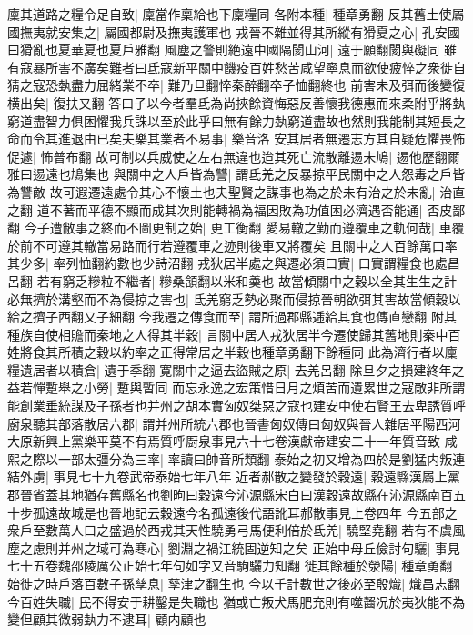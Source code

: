 廩其道路之糧令足自致|{
	廩當作稟給也下廩糧同}
各附本種|{
	種章勇翻}
反其舊土使屬國撫夷就安集之|{
	屬國都尉及撫夷護軍也}
戎晉不雜並得其所縱有猾夏之心|{
	孔安國曰猾亂也夏華夏也夏戶雅翻}
風塵之警則絶遠中國隔閡山河|{
	遠于願翻閡與礙同}
雖有寇暴所害不廣矣難者曰氐寇新平關中饑疫百姓愁苦咸望寧息而欲使疲悴之衆徙自猜之寇恐埶盡力屈緒業不卒|{
	難乃旦翻悴秦醉翻卒子恤翻終也}
前害未及弭而後變復横出矣|{
	復扶又翻}
答曰子以今者羣氐為尚挾餘資悔惡反善懷我德惠而來柔附乎將埶窮道盡智力俱困懼我兵誅以至於此乎曰無有餘力埶窮道盡故也然則我能制其短長之命而令其進退由已矣夫樂其業者不易事|{
	樂音洛}
安其居者無遷志方其自疑危懼畏怖促遽|{
	怖普布翻}
故可制以兵威使之左右無違也迨其死亡流散離逷未鳩|{
	逷他歷翻爾雅曰逷遠也鳩集也}
與關中之人戶皆為讐|{
	謂氐羌之反暴掠平民關中之人怨毒之戶皆為讐敵}
故可遐遷遠處令其心不懷土也夫聖賢之謀事也為之於未有治之於未亂|{
	治直之翻}
道不著而平德不顯而成其次則能轉禍為福因敗為功值困必濟遇否能通|{
	否皮鄙翻}
今子遭敝事之終而不圖更制之始|{
	更工衡翻}
愛易轍之勤而遵覆車之軌何哉|{
	車覆於前不可遵其轍當易路而行若遵覆車之迹則後車又將覆矣}
且關中之人百餘萬口率其少多|{
	率列恤翻約數也少詩沼翻}
戎狄居半處之與遷必須口實|{
	口實謂糧食也處昌呂翻}
若有窮乏糝粒不繼者|{
	糝桑頷翻以米和羮也}
故當傾關中之穀以全其生生之計必無擠於溝壑而不為侵掠之害也|{
	氐羌窮乏勢必聚而侵掠晉朝欲弭其害故當傾穀以給之擠子西翻又子細翻}
今我遷之傳食而至|{
	謂所過郡縣逓給其食也傳直戀翻}
附其種族自使相贍而秦地之人得其半穀|{
	言關中居人戎狄居半今遷使歸其舊地則秦中百姓將食其所積之穀以約率之正得常居之半穀也種章勇翻下餘種同}
此為濟行者以廩糧遺居者以積倉|{
	遺于季翻}
寛關中之逼去盜賊之原|{
	去羌呂翻}
除旦夕之損建終年之益若憚蹔舉之小勞|{
	蹔與暫同}
而忘永逸之宏策惜日月之煩苦而遺累世之寇敵非所謂能創業垂統謀及子孫者也并州之胡本實匈奴桀惡之寇也建安中使右賢王去卑誘質呼廚泉聽其部落散居六郡|{
	謂并州所統六郡也晉書匈奴傳曰匈奴與晉人雜居平陽西河大原新興上黨樂平莫不有焉質呼㕑泉事見六十七卷漢獻帝建安二十一年質音致}
咸熙之際以一部太彊分為三率|{
	率讀曰帥音所類翻}
泰始之初又增為四於是劉猛内叛連結外虜|{
	事見七十九卷武帝泰始七年八年}
近者郝散之變發於穀遠|{
	穀遠縣漢屬上黨郡晉省蓋其地猶存舊縣名也劉昫曰穀遠今沁源縣宋白曰漢穀遠故縣在沁源縣南百五十步孤遠故城是也晉地記云穀遠今名孤遠後代語訛耳郝散事見上卷四年}
今五部之衆戶至數萬人口之盛過於西戎其天性驍勇弓馬便利倍於氐羌|{
	驍堅堯翻}
若有不虞風塵之慮則并州之域可為寒心|{
	劉淵之禍江統固逆知之矣}
正始中母丘儉討句驪|{
	事見七十五卷魏邵陵厲公正始七年句如字又音駒驪力知翻}
徙其餘種於滎陽|{
	種章勇翻}
始徙之時戶落百數子孫孳息|{
	孶津之翻生也}
今以千計數世之後必至殷熾|{
	熾昌志翻}
今百姓失職|{
	民不得安于耕鑿是失職也}
猶或亡叛犬馬肥充則有噬齧况於夷狄能不為變但顧其微弱埶力不逮耳|{
	顧内顧也}
